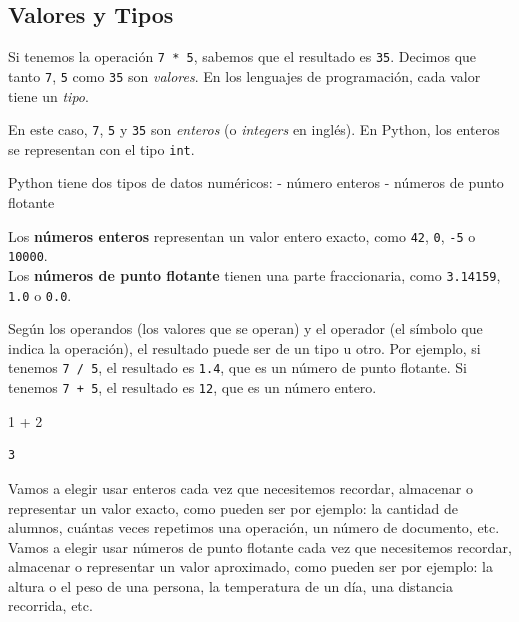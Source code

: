 \documentclass[
  letterpaper,
  DIV=11,
  numbers=noendperiod]{scrreprt}
\newenvironment{Shaded}{\begin{snugshade}}{\end{snugshade}}
\newcommand{\DecValTok}[1]{\textcolor[rgb]{0.68,0.00,0.00}{#1}}
\newcommand{\OperatorTok}[1]{\textcolor[rgb]{0.37,0.37,0.37}{#1}}
\begin{document}
\hypertarget{valores-y-tipos}{%
\subsection{Valores y Tipos}\label{valores-y-tipos}}

Si tenemos la operación \texttt{7\ *\ 5}, sabemos que el resultado es
\texttt{35}. Decimos que tanto \texttt{7}, \texttt{5} como \texttt{35}
son \emph{valores}. En los lenguajes de programación, cada valor tiene
un \emph{tipo}.

En este caso, \texttt{7}, \texttt{5} y \texttt{35} son \emph{enteros} (o
\emph{integers} en inglés). En Python, los enteros se representan con el
tipo \texttt{int}.

Python tiene dos tipos de datos numéricos: - número enteros - números de
punto flotante

Los \textbf{números enteros} representan un valor entero exacto, como
\texttt{42}, \texttt{0}, \texttt{-5} o \texttt{10000}.\\
Los \textbf{números de punto flotante} tienen una parte fraccionaria,
como \texttt{3.14159}, \texttt{1.0} o \texttt{0.0}.

Según los operandos (los valores que se operan) y el operador (el
símbolo que indica la operación), el resultado puede ser de un tipo u
otro. Por ejemplo, si tenemos \texttt{7\ /\ 5}, el resultado es
\texttt{1.4}, que es un número de punto flotante. Si tenemos
\texttt{7\ +\ 5}, el resultado es \texttt{12}, que es un número entero.

\begin{Shaded}
\begin{Highlighting}[]
\DecValTok{1} \OperatorTok{+} \DecValTok{2}
\end{Highlighting}
\end{Shaded}

\begin{verbatim}
3
\end{verbatim}

Vamos a elegir usar enteros cada vez que necesitemos recordar, almacenar
o representar un valor exacto, como pueden ser por ejemplo: la cantidad
de alumnos, cuántas veces repetimos una operación, un número de
documento, etc.\\
Vamos a elegir usar números de punto flotante cada vez que necesitemos
recordar, almacenar o representar un valor aproximado, como pueden ser
por ejemplo: la altura o el peso de una persona, la temperatura de un
día, una distancia recorrida, etc.
\end{document}
